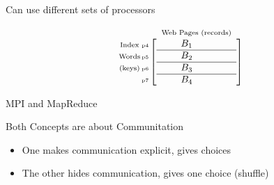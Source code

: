\begin{frame}
\begin{block}{Can use different sets of processors}
\begin{center}
\begin{equation*}
\begin{array}{c@{\hspace{-2ex}}r@{\hspace{-2ex}}c}
          \begin{array}{c}
            \mbox{\scriptsize Index} \\
            \mbox{\scriptsize Words} \\
            \mbox{\scriptsize (keys)}
          \end{array} &
          \begin{array}{c}
            \\  \mbox{\tiny p4} \\ \mbox{\tiny p5} \\
            \mbox{\tiny p6} \\ \mbox{\tiny p7}
          \end{array} &
          \begin{array}{c}
            \mbox{\scriptsize Web Pages (records)} \\
            \left[
            \begin{array}{cccc}
              \quad  & B_1  & \quad & \quad \\
              \hline
              \quad  & B_2  & \quad  &  \quad \\
              \hline
              \quad  & B_3  & \quad  &  \quad \\
              \hline
              \quad  & B_4  & \quad  & \quad
            \end{array}
            \right]
          \end{array}
        \end{array}
      \end{equation*}
    \end{center}
  \end{block}
\end{frame}

\begin{frame}{MPI and MapReduce}
  \begin{block}{Both Concepts are about Communitation}
    \begin{itemize}
    \item One makes communication explicit, gives choices
    \item The other hides communication, gives one choice (shuffle)
    \end{itemize}
  \end{block}
\end{frame}

